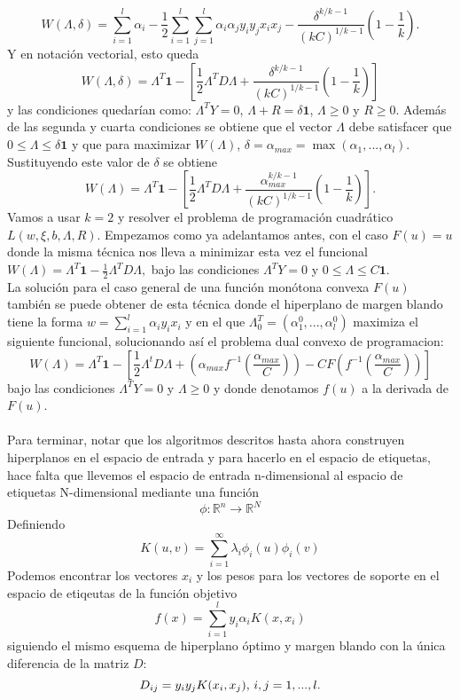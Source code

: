 \[ W(\Lambda,\delta)= \sum_{i=1}^l \alpha_i - \frac{1}{2}\sum_{i=1}^l \sum_{j=1}^l \alpha_i \alpha_j y_i y_j x_i x_j - \frac{\delta^{k/k-1}}{(kC)^{1/k-1}} \left( 1- \frac{1}{k} \right). \]
Y en notación vectorial, esto queda
\[ W(\Lambda,\delta)=\Lambda^T\textbf{1} - \left[ \frac{1}{2} \Lambda^TD\Lambda + \frac{\delta^{k/k-1}}{(kC)^{1/k-1}} \left( 1- \frac{1}{k} \right) \right] \]
y las condiciones quedarían como: $\Lambda^TY=0$, $\Lambda+R=\delta \textbf{1}$, $\Lambda \geq 0$ y $R \geq 0$. Además de las segunda y cuarta condiciones se obtiene que el vector $\Lambda$ debe satisfacer que $0 \leq \Lambda \leq \delta \textbf{1}$ y que para maximizar $W(\Lambda)$, $\delta=\alpha_{max}=\max(\alpha_1,...,\alpha_l)$. Sustituyendo este valor de $\delta$ se obtiene
\[ W(\Lambda)= \Lambda^T\textbf{1} - \left[ \frac{1}{2} \Lambda^TD\Lambda + \frac{\alpha_{max}^{k/k-1}}{(kC)^{1/k-1}} \left( 1- \frac{1}{k} \right) \right]. \]
Vamos a usar $k=2$ y resolver el problema de programación cuadrático $L(w,\xi,b,\Lambda,R)$. Empezamos como ya adelantamos antes, con el caso $F(u)=u$ donde la misma técnica nos lleva a minimizar esta vez el funcional $W(\Lambda)=\Lambda^T\textbf{1} - \frac{1}{2} \Lambda^TD\Lambda,$ bajo las condiciones $\Lambda^TY=0$ y $0 \leq \Lambda \leq C\textbf{1}$.\\
La solución para el caso general de una función monótona convexa $F(u)$ también se puede obtener de esta técnica donde el hiperplano de margen blando tiene la forma $w=\sum_{i=1}^l \alpha_i y_i x_i$ y en el que $\Lambda^T_0=(\alpha^0_1,...,\alpha_l^0)$ maximiza el siguiente funcional, solucionando así el problema dual convexo de programacion:
\[ W(\Lambda)=\Lambda^T\textbf{1} - \left[ \frac{1}{2}\Lambda^tD\Lambda + \left( \alpha_{max}f^{-1} \left( \frac{\alpha_{max}}{C} \right) \right)- CF \left(f^{-1} \left( \frac{\alpha_{max}}{C} \right) \right) \right] \]
bajo las condiciones $\Lambda^TY=0$ y $\Lambda \geq 0$ y donde denotamos $f(u)$ a la derivada de $F(u)$. \cite{cortes1995support}\\\\
Para terminar, notar que los algoritmos descritos hasta ahora construyen hiperplanos en el espacio de entrada y para hacerlo en el espacio de etiquetas, hace falta que llevemos el espacio de entrada n-dimensional al espacio de etiquetas N-dimensional mediante una función 
\[ \phi: \mathbb{R}^n \rightarrow \mathbb{R}^N \]
Definiendo 
\[K(u,v)=\sum_{i=1}^{\infty} \lambda_i \phi_i(u) \phi_i(v) \]
Podemos encontrar los vectores $x_i$ y los pesos para los vectores de soporte en el espacio de etiqeutas de la función objetivo
\[ f(x)=\sum_{i=1}^l y_i\alpha_i K(x,x_i) \]
siguiendo el mismo esquema de hiperplano óptimo y margen blando con la única diferencia de la matriz $D$:
\[ D_{ij}=y_iy_jK(x_i,x_j) \textnormal{,  } i,j=1,...,l. \]
\cite{cortes1995support}

